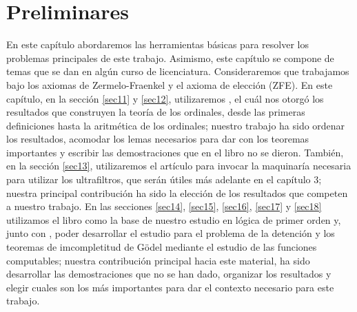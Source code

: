 \documentclass[12pt,a4paper]{book}
\numberwithin{thm}{chapter}
\theoremstyle{definition}
\begin{document}
\chapter{Preliminares}
En este capítulo abordaremos las herramientas básicas para resolver los problemas principales de este trabajo. Asimismo, este capítulo se compone de temas que se dan en algún curso de licenciatura.
Consideraremos que trabajamos bajo los axiomas de Zermelo-Fraenkel y el axioma de elección (ZFE).
En este capítulo, en la sección {\ref{sec11}} y {\ref{sec12}}, utilizaremos \cite[Capítulo 10]{SetTheory}, el cuál nos otorgó los resultados que construyen la teoría de los ordinales, desde las primeras definiciones hasta la aritmética de los ordinales; nuestro trabajo ha sido ordenar los resultados, acomodar los lemas necesarios para dar con los teoremas importantes y escribir las demostraciones que en el libro no se dieron. 
También, en la sección {\ref{sec13}}, utilizaremos el artículo \cite{Ultrafilter} para invocar la maquinaría necesaria para utilizar los ultrafiltros, que serán útiles más adelante en el capítulo 3; nuestra principal contribución ha sido la elección de los resultados que competen a nuestro trabajo.
En las secciones {\ref{sec14}}, {\ref{sec15}}, {\ref{sec16}}, {\ref{sec17}} y {\ref{sec18}} utilizamos el libro \cite[Capítulos 2,3]{logic} como la base de nuestro estudio en lógica de primer orden y, junto con \cite[Capítulos 3,4]{comp1}, poder desarrollar el estudio para el problema de la detención y los teoremas de imcompletitud de Gödel mediante el estudio de las funciones computables; nuestra contribución principal hacia este material, ha sido desarrollar las demostraciones que no se han dado, organizar los resultados y elegir cuales son los más importantes para dar el contexto necesario para este trabajo.









\end{document}
